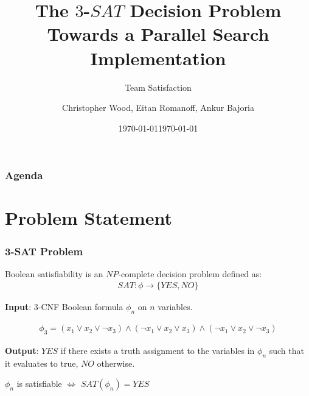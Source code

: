 \documentclass[handout,10pt]{beamer}
\title[Team Satisfaction - $3$-$SAT$]{The $3$-$SAT$ Decision Problem \\ Towards a Parallel Search Implementation}
\institute[RIT]{}
\date{\today}
\subtitle{Team Satisfaction}
\author{Christopher Wood, Eitan Romanoff, Ankur Bajoria}
\date{\today}
\begin{document}
\begin{frame}
	\titlepage
\end{frame}

\begin{frame}
	\frametitle{Agenda}
	\tableofcontents
\end{frame}

\section{Problem Statement}
\begin{frame}
	\frametitle{3-SAT Problem}

	Boolean satisfiability is an $NP$-complete decision problem defined as:
	\begin{align*}
	SAT : \phi \to \{YES, NO\}
	\end{align*}

	\medskip

	\textbf{Input}: 3-CNF Boolean formula $\phi_n$ on $n$ variables.
	
	\begin{align*}
		\phi_3 = (x_1 \lor x_2 \lor \lnot x_3) \land (\lnot x_1 \lor x_2 \lor x_3) \land (\lnot x_1 \lor x_2 \lor \lnot x_3)
	\end{align*}

	\medskip 

	\textbf{Output}: $YES$ if there exists a truth assignment to the
	variables in $\phi_n$ such that it evaluates to true, $NO$ otherwise.

	\medskip

	\begin{center}
		$\phi_n$ is satisfiable $\Leftrightarrow$ $SAT(\phi_n) = YES$
	\end{center}

\end{frame}


\end{document}
